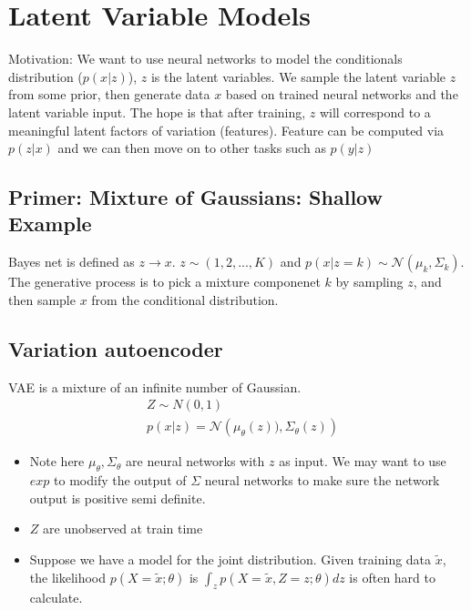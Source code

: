 \chapter{Latent Variable Models}
Motivation: 
We want to use neural networks to model the conditionals distribution ($p(x|z)$), $z$ is the latent variables. We sample the latent variable $z$ from some prior, then generate data $x$ based on trained neural networks and the latent variable input. The hope is that after training, $z$ will correspond to a meaningful latent factors of variation (features). Feature can be computed via $p(z|x)$ and we can then move on to other tasks such as $p(y|z)$



\section{Primer: Mixture of Gaussians: Shallow Example}
Bayes net is defined as $z \rightarrow x$. $z \sim (1,2,...,K)$ and $p(x|z=k) \sim \mathcal{N}(\mu_k, \Sigma_k)$. \\

The generative process is to pick a mixture componenet $k$ by sampling $z$, and then sample $x$ from the conditional distribution. 

\section{Variation autoencoder}
VAE is a mixture of an infinite number of Gaussian. 
    \begin{align*}
        & Z \sim N(0, 1) \\
        & p(x|z) = \mathcal{N}\left (\mu_\theta (z)), \Sigma_\theta(z)\right )
    \end{align*}
    \begin{itemize}
        \item Note here $\mu_\theta, \Sigma_\theta$ are neural networks with $z$ as input. We may want to use $exp$ to modify the output of $\Sigma$ neural networks to make sure the network output is positive semi definite. 
        \item $Z$ are unobserved at train time 
        \item Suppose we have a model for the joint distribution. Given training data $\tilde{x}$, the likelihood $p(X=\tilde{x}; \theta)$ is $\int_z p(X=\tilde{x}, Z=z ; \theta) dz$ is often hard to calculate. 
    \end{itemize}
    



